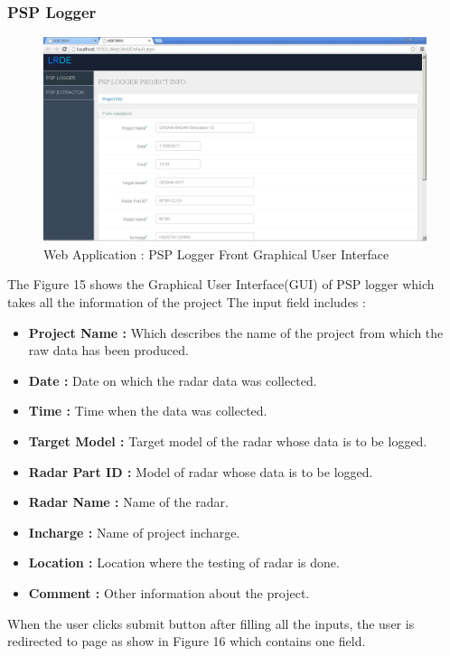 \documentclass[14pt]{article} %
\begin{document}
\subsubsection{PSP Logger}
 \begin{figure}[H]
    \centerline{\includegraphics[width=\linewidth]{LoggerFrontPage.jpg}}
  \caption{Web Application : PSP Logger Front Graphical User Interface}
  \label{fig:figure 15}
\end{figure}
 The Figure 15 shows the Graphical User Interface(GUI) of PSP logger which takes all the information of the project 
  The input field includes :
  \begin{itemize} 
  \item[] \textbf{Project Name : }Which describes the name of the project from which the raw data has been produced.
  \item[] \textbf{Date : }Date on which the radar data was collected. 
  \item[] \textbf{Time : }Time when the data was collected.
  \item[] \textbf{Target Model : }Target model of the radar whose data is to be logged.  
  \item[] \textbf{Radar Part ID : }Model of radar whose data is to be logged.
  \item[] \textbf{Radar Name : }Name of the radar.
  \item[] \textbf{Incharge : }Name of project incharge.
  \item[] \textbf{Location : }Location where the testing of radar is done.
  \item[] \textbf{Comment : }Other information about the project.
  \end{itemize}
  When the user clicks submit button after filling all the inputs, the user is redirected to page as show in Figure 16 which contains one field.\\
\end{document}
